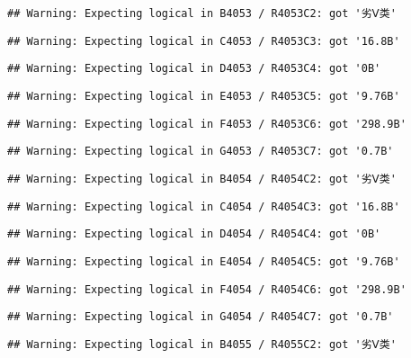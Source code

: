 \documentclass[
]{article}
\begin{document}
\begin{verbatim}
## Warning: Expecting logical in B4053 / R4053C2: got '劣Ⅴ类'
\end{verbatim}

\begin{verbatim}
## Warning: Expecting logical in C4053 / R4053C3: got '16.8B'
\end{verbatim}

\begin{verbatim}
## Warning: Expecting logical in D4053 / R4053C4: got '0B'
\end{verbatim}

\begin{verbatim}
## Warning: Expecting logical in E4053 / R4053C5: got '9.76B'
\end{verbatim}

\begin{verbatim}
## Warning: Expecting logical in F4053 / R4053C6: got '298.9B'
\end{verbatim}

\begin{verbatim}
## Warning: Expecting logical in G4053 / R4053C7: got '0.7B'
\end{verbatim}

\begin{verbatim}
## Warning: Expecting logical in B4054 / R4054C2: got '劣Ⅴ类'
\end{verbatim}

\begin{verbatim}
## Warning: Expecting logical in C4054 / R4054C3: got '16.8B'
\end{verbatim}

\begin{verbatim}
## Warning: Expecting logical in D4054 / R4054C4: got '0B'
\end{verbatim}

\begin{verbatim}
## Warning: Expecting logical in E4054 / R4054C5: got '9.76B'
\end{verbatim}

\begin{verbatim}
## Warning: Expecting logical in F4054 / R4054C6: got '298.9B'
\end{verbatim}

\begin{verbatim}
## Warning: Expecting logical in G4054 / R4054C7: got '0.7B'
\end{verbatim}

\begin{verbatim}
## Warning: Expecting logical in B4055 / R4055C2: got '劣Ⅴ类'
\end{verbatim}
\end{document}
